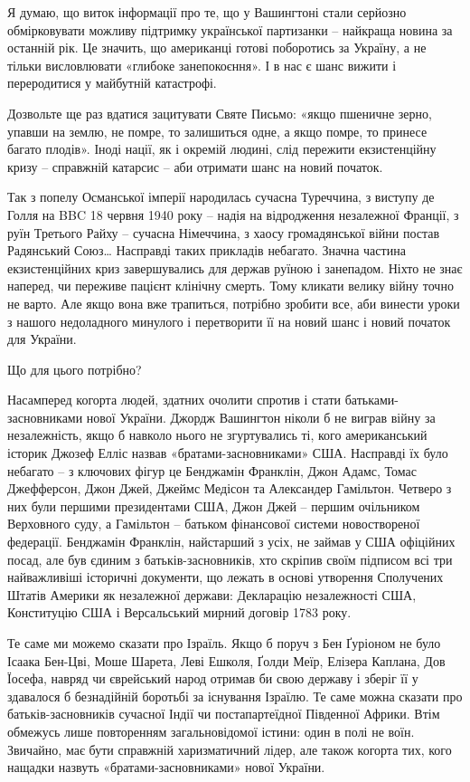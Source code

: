 Я думаю, що виток інформації про те, що у Вашингтоні стали серйозно
обмірковувати можливу підтримку української партизанки – найкраща новина за
останній рік. Це значить, що американці готові поборотись за Україну, а не
тільки висловлювати «глибоке занепокоєння». І в нас є шанс вижити і
переродитися у майбутній катастрофі.

Дозвольте ще раз вдатися зацитувати Святе Письмо: «якщо пшеничне зерно, упавши
на землю, не помре, то залишиться одне, а якщо помре, то принесе багато
плодів». Іноді нації, як і окремій людині, слід пережити екзистенційну кризу –
справжній катарсис – аби отримати шанс на новий початок. 

Так з попелу Османської імперії народилась сучасна Туреччина, з виступу де
Голля на BBC 18 червня 1940 року – надія на відродження незалежної Франції, з
руїн Третього Райху – сучасна Німеччина, з хаосу громадянської війни постав
Радянський Союз… Насправді таких прикладів небагато. Значна частина
екзистенційних криз завершувались для держав руїною і занепадом. Ніхто не знає
наперед, чи переживе пацієнт клінічну смерть. Тому кликати велику війну точно
не варто. Але якщо вона вже трапиться, потрібно зробити все, аби винести уроки
з нашого недоладного минулого і перетворити її на новий шанс і новий початок
для України.

Що для цього потрібно? 

Насамперед когорта людей, здатних очолити спротив і стати батьками-засновниками
нової України. Джордж Вашингтон ніколи б не виграв війну за незалежність, якщо
б навколо нього не згуртувались ті, кого американський історик Джозеф Елліс
назвав «братами-засновниками» США. Насправді їх було небагато – з ключових
фігур це Бенджамін Франклін, Джон Адамс, Томас Джефферсон, Джон Джей, Джеймс
Медісон та Александер Гамільтон. Четверо з них були першими президентами США,
Джон Джей – першим очільником Верховного суду, а Гамільтон – батьком фінансової
системи новоствореної федерації. Бенджамін Франклін, найстарший з усіх, не
займав у США офіційних посад, але був єдиним з батьків-засновників, хто скріпив
своїм підписом всі три найважливіші історичні документи, що лежать в основі
утворення Сполучених Штатів Америки як незалежної держави: Декларацію
незалежності США, Конституцію США і Версальський мирний договір 1783 року.

Те саме ми можемо сказати про Ізраїль. Якщо б поруч з Бен Ґуріоном не було
Ісаака Бен-Цві, Моше Шарета, Леві Ешколя, Ґолди Меїр, Елізера Каплана, Дов
Їосефа, навряд чи єврейський народ отримав би свою державу і зберіг її у
здавалося б безнадійній боротьбі за існування Ізраїлю. Те саме можна сказати
про батьків-засновників сучасної Індії чи постапартеїдної Південної Африки.
Втім обмежусь лише повторенням загальновідомої істини: один в полі не воїн.
Звичайно, має бути справжній харизматичний лідер, але також когорта тих, кого
нащадки назвуть «братами-засновниками» нової України.

